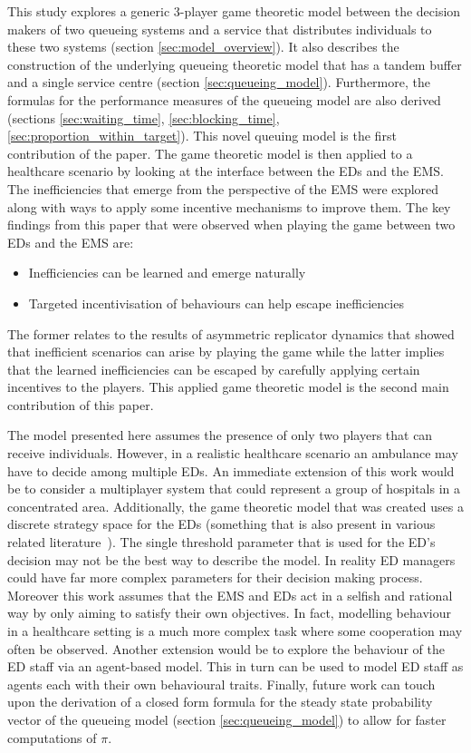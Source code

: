 This study explores a generic 3-player game theoretic model between the
decision makers of two queueing systems and a service that distributes
individuals to these two systems (section \ref{sec:model_overview}).
It also describes the construction of the underlying queueing theoretic model
that has a tandem buffer and a single service centre (section
\ref{sec:queueing_model}).
Furthermore, the formulas for the performance measures of the queueing model
are also derived (sections \ref{sec:waiting_time}, \ref{sec:blocking_time},
\ref{sec:proportion_within_target}).
This novel queuing model is the first contribution of the paper.
The game theoretic model is then applied to a healthcare scenario by looking at
the interface between the EDs and the EMS.
The inefficiencies that emerge from the perspective of the EMS were explored
along with ways to apply some incentive mechanisms to improve them.
The key findings from this paper that were observed when playing the game
between two EDs and the EMS are:
\begin{itemize}
    \item Inefficiencies can be learned and emerge naturally
    \item Targeted incentivisation of behaviours can help escape inefficiencies
\end{itemize}
The former relates to the results of asymmetric replicator dynamics that showed
that inefficient scenarios can arise by playing the game while the latter
implies that the learned inefficiencies can be escaped by carefully applying
certain incentives to the players.
This applied game theoretic model is the second main contribution of this paper.

The model presented here assumes the presence of only two players that can
receive individuals.
However, in a realistic healthcare scenario an ambulance may have to decide
among multiple EDs.
An immediate extension of this work would be to consider a multiplayer system
that could represent a group of hospitals in a concentrated area.
Additionally, the game theoretic model that was created uses a discrete
strategy space for the EDs (something that is also present in various related
literature~\cite{deo2011centralized, knight2017measuring}).
The single threshold parameter that is used for the ED's decision may not be
the best way to describe the model.
In reality ED managers could have far more complex parameters for their
decision making process.
Moreover this work assumes that the EMS and EDs act in a selfish and rational
way by only aiming to satisfy their own objectives.
In fact, modelling behaviour in a healthcare setting is a much more complex
task where some cooperation may often be observed.
Another extension would be to explore the behaviour of the ED staff via an
agent-based model.
This in turn can be used to model ED staff as agents each with their own
behavioural traits.
Finally, future work can touch upon the derivation of a closed form formula for
the steady state probability vector of the queueing model
(section \ref{sec:queueing_model}) to allow for faster computations of \(\pi\).
